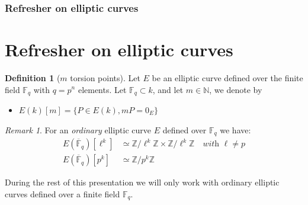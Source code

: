 \documentclass[10pt,a4paper]{beamer}
\theoremstyle{plain}
\theoremstyle{definition}
\theoremstyle{definition}
\theoremstyle{definition}
\theoremstyle{definition}
\newtheorem{defi}[thm]{Definition}
\theoremstyle{remark}
\newtheorem{rem}[thm]{Remark}
\theoremstyle{remark}
\begin{document}
\begin{frame}
\frametitle{Refresher on elliptic curves}
\section{Refresher on elliptic curves}


\begin{defi}[$m$ torsion points]
Let $E$ be an elliptic curve defined over the finite field $\mathbb{F}_q$ with $q=p^n$ elements.
Let $\mathbb{F}_q\subset k$, and let $m \in \mathbb{N}$, we denote by
\begin{itemize}
\item $E(k)[m]= \{ P \in E(k) , mP=0_E \} $
\end{itemize} 
\end{defi}

\begin{rem}
For an \emph{ordinary} elliptic curve $E$ defined over $\mathbb{F}_q$ we have:
\begin{align*}
E(\overline{\mathbb{F}}_q)[\ell^k]&\simeq\mathbb{Z}/\ell^k\mathbb{Z} \times \mathbb{Z}/\ell^k\mathbb{Z} \quad \textit{with } \ell \neq p \\
E(\overline{\mathbb{F}}_q)[p^k]&\simeq\mathbb{Z}/p^k\mathbb{Z}
\end{align*}
\end{rem}

During the rest of this presentation we will only work with ordinary elliptic curves defined over a finite field $\mathbb{F}_q$.

\end{frame}
\end{document}
